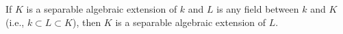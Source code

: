 If $K$ is a separable algebraic extension of $k$ and $L$ is any field between $k$ and $K$ (i.e., $k \subset L \subset K$), then $K$ is a separable algebraic extension of $L$.
